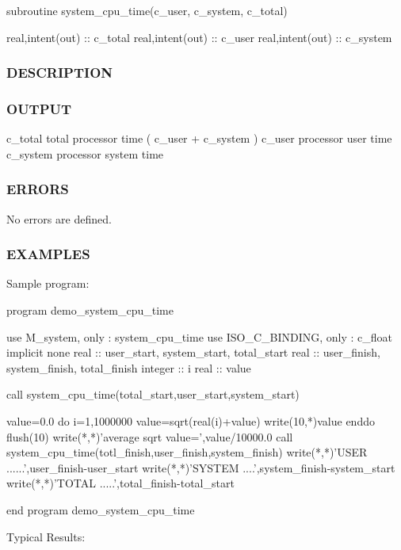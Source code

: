 \begin{DoxyVerb}    subroutine system_cpu_time(c_user, c_system, c_total)

     real,intent(out) :: c_total
     real,intent(out) :: c_user
     real,intent(out) :: c_system
\end{DoxyVerb}


\subsubsection*{D\+E\+S\+C\+R\+I\+P\+T\+I\+ON}

\subsubsection*{O\+U\+T\+P\+UT}

c\+\_\+total total processor time ( c\+\_\+user + c\+\_\+system ) c\+\_\+user processor user time c\+\_\+system processor system time

\subsubsection*{E\+R\+R\+O\+RS}

No errors are defined.

\subsubsection*{E\+X\+A\+M\+P\+L\+ES}

\begin{DoxyVerb}Sample program:

   program demo_system_cpu_time

   use M_system, only : system_cpu_time
   use ISO_C_BINDING, only : c_float
   implicit none
   real    :: user_start, system_start, total_start
   real    :: user_finish, system_finish, total_finish
   integer :: i
   real    :: value

      call system_cpu_time(total_start,user_start,system_start)

      value=0.0
      do i=1,1000000
         value=sqrt(real(i)+value)
         write(10,*)value
      enddo
      flush(10)
      write(*,*)'average sqrt value=',value/10000.0
      call system_cpu_time(totl_finish,user_finish,system_finish)
      write(*,*)'USER ......',user_finish-user_start
      write(*,*)'SYSTEM ....',system_finish-system_start
      write(*,*)'TOTAL .....',total_finish-total_start

   end program demo_system_cpu_time

Typical Results: \end{DoxyVerb}
 \mbox{\label{namespacem__system_a5a32db818a9ffb0a4ea724e95356c560}} 
